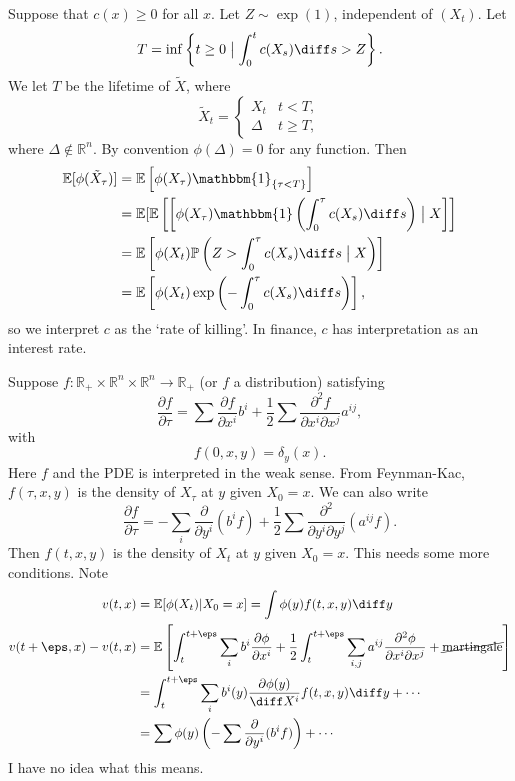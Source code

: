 \documentclass[12pt]{article}
\begin{document}
\begin{remark}
	Suppose that $c(x) \geq 0$ for all $x$. Let $Z \sim \exp(1)$, independent of $(X_t)$. Let
	\[
		T = \inf \left\{ t \geq 0 \bigm| \int_0^{t} c(X_s) \diff s > Z \right\}.
	\]
	We let $T$ be the lifetime of $\tilde X$, where
	\[
	\tilde X_t =
	\begin{cases}
		X_t & t < T, \\
		\Delta & t\geq T,
	\end{cases}
	\]
	where $\Delta \not \in \mathbb{R}^{n}$. By convention $\phi(\Delta) = 0$ for any function. Then
	\begin{align*}
		\mathbb{E}[\phi(\tilde X_\tau)] &= \mathbb{E}\left[ \phi(X_\tau) \mathbbm{1}_{\{\tau < T\}} \right] \\
						&= \mathbb{E}[ \mathbb{E}\left[\left[\phi(X_\tau) \mathbbm{1}\left(\int_0^{\tau} c(X_s) \diff s\right) \bigm| X \right]\right] \\
						&= \mathbb{E}\left[\phi(X_t) \mathbb{P}\left(Z > \int_0^{\tau} c(X_s) \diff s \bigm| X\right) \right] \\
						&= \mathbb{E}\left[ \phi(X_t) \exp \left( - \int_0^{\tau} c(X_s) \diff s \right) \right],
	\end{align*}
	so we interpret $c$ as the `rate of killing'. In finance, $c$ has interpretation as an interest rate.
\end{remark}

\begin{remark}
	Suppose $f : \mathbb{R}_+ \times \mathbb{R}^{n} \times \mathbb{R}^{n} \to \mathbb{R}_+$ (or $f$ a distribution) satisfying
	\[
	\frac{\partial f}{\partial \tau} = \sum \frac{\partial f}{\partial x^{i}} b^{i} + \frac 12 \sum \frac{\partial^2 f}{\partial x^{i} \partial x^{j}} a^{ij},
	\]
	with
	\[
	f(0, x, y) = \delta_y(x).
	\]
	Here $f$ and the PDE is interpreted in the weak sense. From Feynman-Kac, $f(\tau, x, y)$ is the density of $X_\tau$ at $y$ given $X_0 = x$. We can also write
	\[
	\frac{\partial f}{\partial \tau} = - \sum_{i} \frac{\partial}{\partial y^{i}} (b^{i} f) + \frac 12 \sum \frac{\partial^2}{\partial y^{i} \partial y^{j}} (a^{ij} f).
	\]
	Then $f(t, x, y)$ is the density of $X_t$ at $y$ given $X_0 = x$. This needs some more conditions. Note
	\begin{align*}
		v(t, x) &= \mathbb{E}[\phi(X_t) | X_0 = x] = \int \phi(y) f(t, x, y) \diff y \\
		v(t + \eps, x) - v(t, x) &= \mathbb{E}\left[ \int_{t}^{t + \eps} \sum_i b^{i} \frac{\partial \phi}{\partial x^{i}} + \frac 12 \int_t^{t + \eps} \sum_{i, j} a^{ij} \frac{\partial^2 \phi}{\partial x^{i} \partial x^{j}} + \cancel{\text{martingale}} \right] \\
					 &= \int_{t}^{t + \eps} \sum_i b^{i}(y) \frac{\partial \phi(y)}{\diff X^{i}} f(t, x, y) \diff y + \cdots \\
					 &= \sum \phi(y) \left( - \sum \frac{\partial}{\partial y^{i}} (b^{i} f ) \right) + \cdots
	\end{align*}
	I have no idea what this means.
\end{remark}
\end{document}
